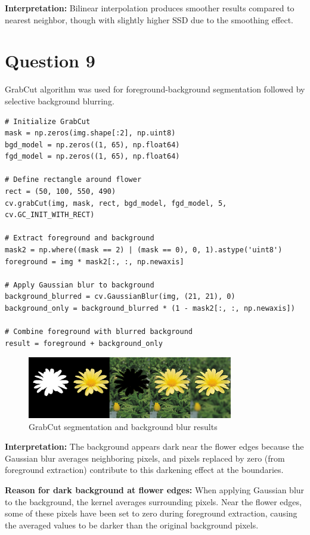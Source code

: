 \documentclass[10pt,a4paper]{article}
\begin{document}
\textbf{Interpretation:} Bilinear interpolation produces smoother results compared to nearest neighbor, though with slightly higher SSD due to the smoothing effect.

\section{Question 9}
GrabCut algorithm was used for foreground-background segmentation followed by selective background blurring.

\begin{lstlisting}[caption=GrabCut segmentation and background blur]
# Initialize GrabCut
mask = np.zeros(img.shape[:2], np.uint8)
bgd_model = np.zeros((1, 65), np.float64)
fgd_model = np.zeros((1, 65), np.float64)

# Define rectangle around flower
rect = (50, 100, 550, 490)
cv.grabCut(img, mask, rect, bgd_model, fgd_model, 5, cv.GC_INIT_WITH_RECT)

# Extract foreground and background
mask2 = np.where((mask == 2) | (mask == 0), 0, 1).astype('uint8')
foreground = img * mask2[:, :, np.newaxis]

# Apply Gaussian blur to background
background_blurred = cv.GaussianBlur(img, (21, 21), 0)
background_only = background_blurred * (1 - mask2[:, :, np.newaxis])

# Combine foreground with blurred background
result = foreground + background_only
\end{lstlisting}

\begin{figure}[H]
    \centering
    \includegraphics[width=0.8\textwidth]{task9/q9_outputs.png}
    \caption{GrabCut segmentation and background blur results}
\end{figure}

\textbf{Interpretation:} The background appears dark near the flower edges because the Gaussian blur averages neighboring pixels, and pixels replaced by zero (from foreground extraction) contribute to this darkening effect at the boundaries.

\textbf{Reason for dark background at flower edges:} When applying Gaussian blur to the background, the kernel averages surrounding pixels. Near the flower edges, some of these pixels have been set to zero during foreground extraction, causing the averaged values to be darker than the original background pixels.
\end{document}
